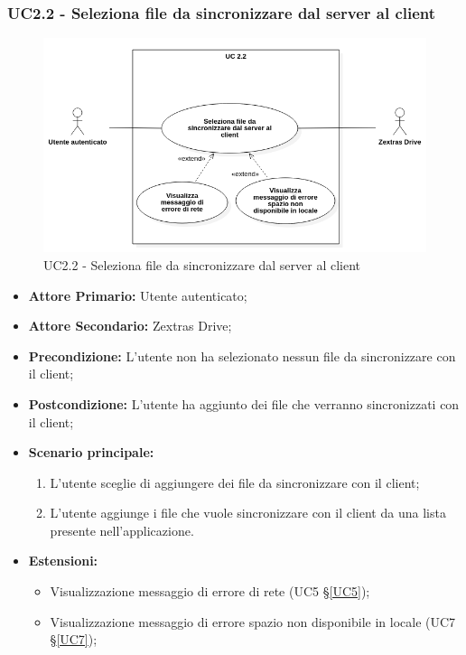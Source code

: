 \subsubsection{UC2.2 - Seleziona file da sincronizzare dal server al client}
\begin{figure}[H]
    \centering
    \includegraphics[scale = 0.6]{components/img/UC2_2.png}
    \caption{UC2.2 - Seleziona file da sincronizzare dal server al client}
\end{figure}
\begin{itemize}
\item \textbf{Attore Primario:} Utente autenticato;
\item \textbf{Attore Secondario:} Zextras Drive;
\item \textbf{Precondizione:} L'utente non ha selezionato nessun file da sincronizzare con il client;
\item \textbf{Postcondizione:} L'utente ha aggiunto dei file che verranno sincronizzati con il client;
\item \textbf{Scenario principale:}
    \begin{enumerate}
    \item L'utente sceglie di aggiungere dei file da sincronizzare con il client;
    \item L'utente aggiunge i file che vuole sincronizzare con il client da una lista presente nell'applicazione.
    \end{enumerate}
\item \textbf{Estensioni:}
    \begin{itemize}
    \item Visualizzazione messaggio di errore di rete (UC5 \S{}\ref{UC5});
    \item Visualizzazione messaggio di errore spazio non disponibile in locale (UC7 \S{}\ref{UC7});
    \end{itemize}
\end{itemize}

